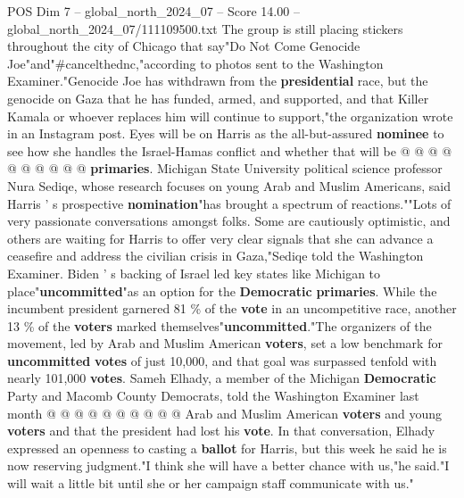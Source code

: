 \begin{textsample}{POS Dim 7 – global\_north\_2024\_07 – Score 14.00 – global\_north\_2024\_07/111109500.txt}
The group is still placing stickers throughout the city of Chicago that say"Do Not Come Genocide Joe"and"\#cancelthednc,"according to photos sent to the Washington Examiner."Genocide Joe has withdrawn from the \textbf{presidential} race, but the genocide on Gaza that he has funded, armed, and supported, and that Killer Kamala or whoever replaces him will continue to support,"the organization wrote in an Instagram post.
Eyes will be on Harris as the all-but-assured \textbf{nominee} to see how she handles the Israel-Hamas conflict and whether that will be @ @ @ @ @ @ @ @ @ @ \textbf{primaries}.
Michigan State University political science professor Nura Sediqe, whose research focuses on young Arab and Muslim Americans, said Harris ' s prospective \textbf{nomination}"has brought a spectrum of reactions.""Lots of very passionate conversations amongst folks.
Some are cautiously optimistic, and others are waiting for Harris to offer very clear signals that she can advance a ceasefire and address the civilian crisis in Gaza,"Sediqe told the Washington Examiner.
Biden ' s backing of Israel led key states like Michigan to place"\textbf{uncommitted}"as an option for the \textbf{Democratic} \textbf{primaries}.
While the incumbent president garnered 81 \% of the \textbf{vote} in an uncompetitive race, another 13 \% of the \textbf{voters} marked themselves"\textbf{uncommitted}."The organizers of the movement, led by Arab and Muslim American \textbf{voters}, set a low benchmark for \textbf{uncommitted} \textbf{votes} of just 10,000, and that goal was surpassed tenfold with nearly 101,000 \textbf{votes}.
Sameh Elhady, a member of the Michigan \textbf{Democratic} Party and Macomb County Democrats, told the Washington Examiner last month @ @ @ @ @ @ @ @ @ @ Arab and Muslim American \textbf{voters} and young \textbf{voters} and that the president had lost his \textbf{vote}.
In that conversation, Elhady expressed an openness to casting a \textbf{ballot} for Harris, but this week he said he is now reserving judgment."I think she will have a better chance with us,"he said."I will wait a little bit until she or her campaign staff communicate with us."

\end{textsample}
